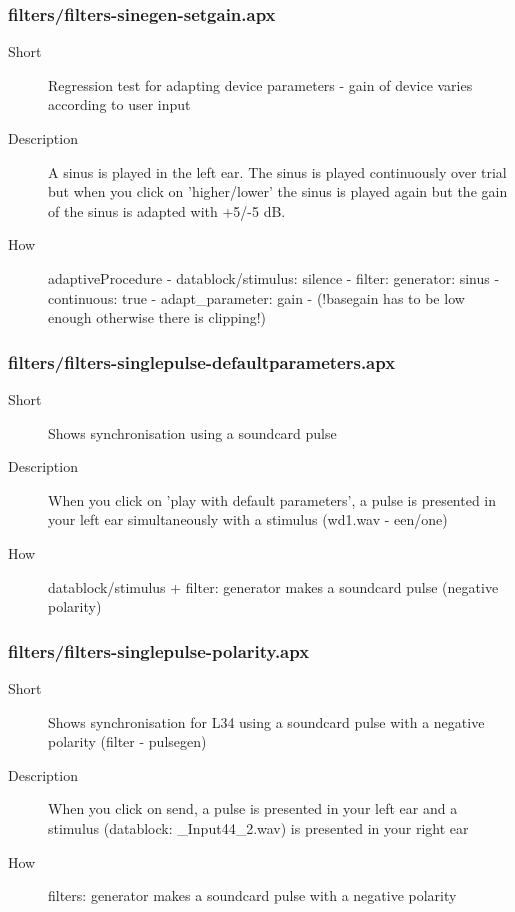 \subsubsection{filters/filters-sinegen-setgain.apx}
\begin{description}
\item[Short] 
 Regression test for adapting device parameters - gain of device varies according to user input
\item[Description] 
 A sinus is played in the left ear. The sinus is played continuously over trial but when you click on 'higher/lower' the sinus is played again but the gain of the sinus is adapted with +5/-5 dB.
\item[How] 
 adaptiveProcedure - datablock/stimulus: silence - filter: generator: sinus - continuous: true - adapt\_parameter: gain - (!basegain has to be low enough otherwise there is clipping!)
\end{description}

\subsubsection{filters/filters-singlepulse-defaultparameters.apx}
\begin{description}
\item[Short] 
        Shows synchronisation  using a soundcard pulse
\item[Description] 
 When you click on 'play with default parameters', a pulse is presented in your left ear simultaneously with a stimulus (wd1.wav - een/one)
\item[How] 
 datablock/stimulus + filter: generator makes a soundcard pulse (negative polarity)
\end{description}

\subsubsection{filters/filters-singlepulse-polarity.apx}
\begin{description}
\item[Short] 
        Shows synchronisation for L34 using a soundcard pulse with a negative polarity (filter - pulsegen)
\item[Description] 
 When you click on send, a pulse is presented in your left ear and a stimulus (datablock: \_Input44\_2.wav) is presented in your right ear
\item[How] 
 filters: generator makes a soundcard pulse with a negative polarity
\end{description}

